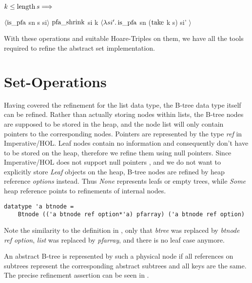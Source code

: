 \begin{lemma}
    $k \le \operatorname{length} s\Longrightarrow$ \\
    \begin{center}
    $\langle \operatorname{is\_pfa}$ sn s si$\rangle$
    $\operatorname{pfa\_shrink}$ si k
    $\langle\lambda si'. \operatorname{is\_pfa}$ sn ($\operatorname{take}$ k s) si' $\rangle$
    \end{center}
\end{lemma}

With these operations and suitable Hoare-Triples on them,
we have all the tools required to refine the abstract set implementation.

\section{Set-Operations}

Having covered the refinement for the list data type,
the B-tree data type itself can be refined.
Rather than actually storing nodes within lists,
the B-tree nodes are supposed to be stored in the heap,
and the node list will only contain pointers to the corresponding nodes.
Pointers are represented by the type \textit{ref} in Imperative/HOL.
Leaf nodes contain no information and consequently don't have to be stored
on the heap, therefore we refine them using null pointers.
Since Imperative/HOL does not support null pointers \parencite{DBLP:conf/tphol/BulwahnKHEM08},
and we do not want to explicitly store \textit{Leaf} objects on the heap,
B-tree nodes are refined by heap reference \textit{options} instead.
Thus \textit{None} represents leafs or empty trees,
while \textit{Some} heap reference points to refinements of internal nodes.

\begin{lstlisting}[mathescape=true, language=Isabelle]
datatype 'a btnode =
    Btnode (('a btnode ref option*'a) pfarray) ('a btnode ref option)
\end{lstlisting}

Note the similarity to the definition in ,
only that \textit{btree} was replaced by \textit{btnode ref option},
\textit{list} was replaced by \textit{pfarray},
and there is no leaf case anymore.

An abstract B-tree is represented by such a physical node
if all references on subtrees represent the corresponding
abstract subtrees and all keys are the same.
The precise refinement assertion can be seen in .

